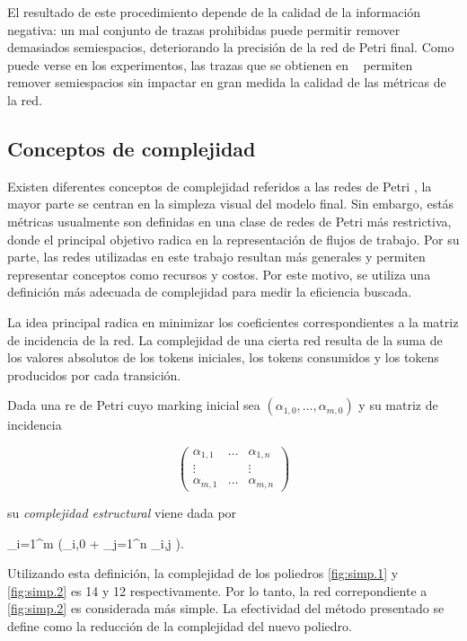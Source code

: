 El resultado de este procedimiento depende de la calidad de la información negativa:
un mal conjunto de trazas prohibidas puede permitir remover demasiados semiespacios,
deteriorando la precisión de la red de Petri final. Como puede verse en los experimentos,
las trazas que se obtienen en ~\cite{BrouckeWVB14} permiten remover semiespacios sin 
impactar en gran medida la calidad de las métricas de la red.

\subsection{Conceptos de complejidad}
\label{sec:3.complexity}

Existen diferentes conceptos de complejidad referidos a las redes de Petri \cite{Lassen08}\cite{Mendling2007},
la mayor parte se centran en la simpleza visual del modelo final. Sin embargo, estás métricas usualmente 
son definidas en una clase de redes de Petri más restrictiva, donde el principal objetivo radica en la 
representación de flujos de trabajo. Por su parte, las redes utilizadas en este trabajo resultan más generales
y permiten representar conceptos como recursos y costos. Por este motivo, se utiliza una definición más adecuada
de complejidad para medir la eficiencia buscada.

La idea principal radica en minimizar los coeficientes correspondientes a la matriz de incidencia de la red.
La complejidad de una cierta red resulta de la suma de los valores absolutos de los tokens iniciales, 
los tokens consumidos y los tokens producidos por cada transición.

Dada una re de Petri cuyo marking inicial sea $(\alpha_{1,0}, \dots, \alpha_{m,0})$ y su matriz de incidencia

\begin{equation*}
\left(\begin{array}{ccc} \alpha_{1,1} & \dots & \alpha_{1,n} \\  \vdots & & \vdots \\ \alpha_{m,1} & \dots & \alpha_{m,n}\end{array} \right)
\end{equation*}

su \textit{complejidad estructural} viene dada por 

\bequation
    \sum\limits_{i=1}^m (\lvert \alpha_{i,0} \rvert + \sum\limits_{j=1}^n \lvert \alpha_{i,j} \rvert).
\eequation

Utilizando esta definición, la complejidad de los poliedros \autoref{fig:simp.1} y \autoref{fig:simp.2} es 14 y 12 respectivamente.
Por lo tanto, la red correpondiente a \autoref{fig:simp.2} es considerada más simple.
La efectividad del método presentado se define como la reducción de la complejidad del nuevo poliedro.

